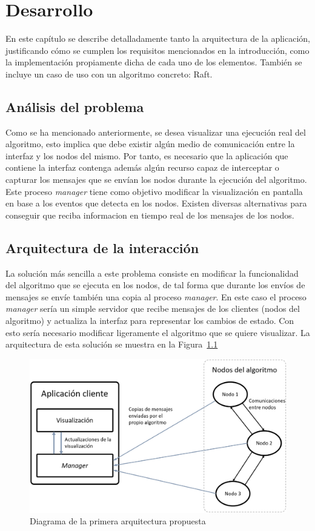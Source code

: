 \chapter{Desarrollo}

En este capítulo se describe detalladamente tanto la arquitectura de la aplicación, justificando cómo se cumplen los requisitos mencionados en la introducción, como la implementación propiamente dicha de cada uno de los elementos. También se incluye un caso de uso con un algoritmo concreto: Raft.

\section{Análisis del problema}

Como se ha mencionado anteriormente, se desea visualizar una ejecución real del algoritmo, esto implica que debe existir algún medio de comunicación entre la interfaz y los nodos del mismo. Por tanto, es necesario que la aplicación que contiene la interfaz contenga además algún recurso capaz de interceptar o capturar los mensajes que se envían los nodos durante la ejecución del algoritmo. Este proceso \textit{manager} tiene como objetivo modificar la visualización en pantalla en base a los eventos que detecta en los nodos. Existen diversas alternativas para conseguir que reciba informacion en tiempo real de los mensajes de los nodos.

\section{Arquitectura de la interacción}

La solución más sencilla a este problema consiste en modificar la funcionalidad del algoritmo que se ejecuta en los nodos, de tal forma que durante los envíos de mensajes se envíe también una copia al proceso \textit{manager}. En este caso el proceso \textit{manager} sería un simple servidor que recibe mensajes de los clientes (nodos del algoritmo) y actualiza la interfaz para representar los cambios de estado. Con esto sería necesario modificar ligeramente el algoritmo que se quiere visualizar. La arquitectura de esta solución se muestra en la Figura~\ref{fig:arquitectura1}

\newpage

\begin{figure}[h]
  \centering
  \includegraphics[width=0.7\linewidth]{imagenes/arquitectura1}
  \caption{Diagrama de la primera arquitectura propuesta}
  \label{fig:arquitectura1}
\end{figure}

